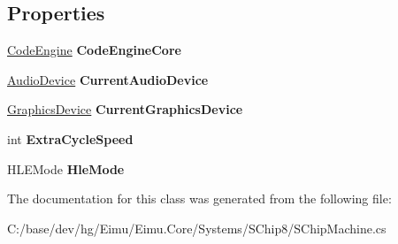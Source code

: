\subsection*{Properties}
\begin{DoxyCompactItemize}
\item 
\hypertarget{class_eimu_1_1_core_1_1_systems_1_1_s_chip8_1_1_s_chip_machine_a7b84018fd4b19417a162bd28826b4d45}{
\hyperlink{class_eimu_1_1_core_1_1_systems_1_1_s_chip8_1_1_code_engine}{CodeEngine} {\bfseries CodeEngineCore}}
\label{class_eimu_1_1_core_1_1_systems_1_1_s_chip8_1_1_s_chip_machine_a7b84018fd4b19417a162bd28826b4d45}

\item 
\hypertarget{class_eimu_1_1_core_1_1_systems_1_1_s_chip8_1_1_s_chip_machine_ad5484d9abdcf0ef9e65a4c3d099f8a4e}{
\hyperlink{class_eimu_1_1_core_1_1_systems_1_1_s_chip8_1_1_audio_device}{AudioDevice} {\bfseries CurrentAudioDevice}}
\label{class_eimu_1_1_core_1_1_systems_1_1_s_chip8_1_1_s_chip_machine_ad5484d9abdcf0ef9e65a4c3d099f8a4e}

\item 
\hypertarget{class_eimu_1_1_core_1_1_systems_1_1_s_chip8_1_1_s_chip_machine_af19c24fe10b15fe343426cbf42028453}{
\hyperlink{class_eimu_1_1_core_1_1_systems_1_1_s_chip8_1_1_graphics_device}{GraphicsDevice} {\bfseries CurrentGraphicsDevice}}
\label{class_eimu_1_1_core_1_1_systems_1_1_s_chip8_1_1_s_chip_machine_af19c24fe10b15fe343426cbf42028453}

\item 
\hypertarget{class_eimu_1_1_core_1_1_systems_1_1_s_chip8_1_1_s_chip_machine_a29a87acb1d7726ce0c40b565ec10b9e7}{
int {\bfseries ExtraCycleSpeed}}
\label{class_eimu_1_1_core_1_1_systems_1_1_s_chip8_1_1_s_chip_machine_a29a87acb1d7726ce0c40b565ec10b9e7}

\item 
\hypertarget{class_eimu_1_1_core_1_1_systems_1_1_s_chip8_1_1_s_chip_machine_a95cd98f9494a16733605b5d235a7b78f}{
HLEMode {\bfseries HleMode}}
\label{class_eimu_1_1_core_1_1_systems_1_1_s_chip8_1_1_s_chip_machine_a95cd98f9494a16733605b5d235a7b78f}

\end{DoxyCompactItemize}


The documentation for this class was generated from the following file:\begin{DoxyCompactItemize}
\item 
C:/base/dev/hg/Eimu/Eimu.Core/Systems/SChip8/SChipMachine.cs\end{DoxyCompactItemize}
